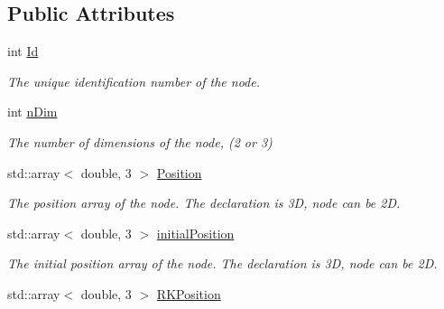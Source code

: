 \subsection*{Public Attributes}
\begin{DoxyCompactItemize}
\item 
\hypertarget{classNode_a1bd379569cc1a8b96432e61971aed4d9}{}int \hyperlink{classNode_a1bd379569cc1a8b96432e61971aed4d9}{Id}\label{classNode_a1bd379569cc1a8b96432e61971aed4d9}

\begin{DoxyCompactList}\small\item\em The unique identification number of the node. \end{DoxyCompactList}\item 
\hypertarget{classNode_ae23958d63ecbf80559c307c955be8227}{}int \hyperlink{classNode_ae23958d63ecbf80559c307c955be8227}{n\+Dim}\label{classNode_ae23958d63ecbf80559c307c955be8227}

\begin{DoxyCompactList}\small\item\em The number of dimensions of the node, (2 or 3) \end{DoxyCompactList}\item 
\hypertarget{classNode_a70e54350ca21406946b8e1b34360dbae}{}std\+::array$<$ double, 3 $>$ \hyperlink{classNode_a70e54350ca21406946b8e1b34360dbae}{Position}\label{classNode_a70e54350ca21406946b8e1b34360dbae}

\begin{DoxyCompactList}\small\item\em The position array of the node. The declaration is 3\+D, node can be 2\+D. \end{DoxyCompactList}\item 
\hypertarget{classNode_a9be696870819e43f033b984c2592d539}{}std\+::array$<$ double, 3 $>$ \hyperlink{classNode_a9be696870819e43f033b984c2592d539}{initial\+Position}\label{classNode_a9be696870819e43f033b984c2592d539}

\begin{DoxyCompactList}\small\item\em The initial position array of the node. The declaration is 3\+D, node can be 2\+D. \end{DoxyCompactList}\item 
\hypertarget{classNode_a34061bba1f26ce526f8cb17ed2bab561}{}std\+::array$<$ double, 3 $>$ \hyperlink{classNode_a34061bba1f26ce526f8cb17ed2bab561}{R\+K\+Position}\label{classNode_a34061bba1f26ce526f8cb17ed2bab561}


\end{DoxyCompactItemize}
